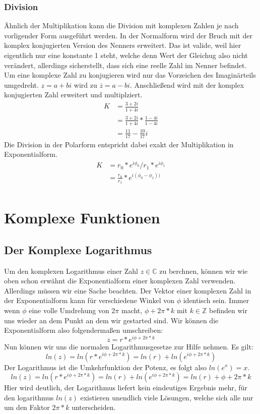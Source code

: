 \documentclass[a4paper, 12pt]{article}
\begin{document}
\subsubsection{Division}
Ähnlich der Multiplikation kann die Division mit komplexen Zahlen je nach vorligender Form ausgeführt werden.
In der Normalform wird der Bruch mit der komplex konjugierten Version des Nenners erweitert. Das ist valide, weil hier eigentlich nur eine konstante 1 steht, welche denn Wert der Gleichug also nicht verändert, allerdings sicherstellt, dass sich eine reelle Zahl im Nenner befindet. 
Um eine komplexe Zahl zu konjugieren wird nur das Vorzeichen des Imaginärteils umgedreht. 
$z = a +bi$ wird zu  $\overline{z} = a - bi$.
Anschließend wird mit der komplex konjugierten Zahl erweitert und multiplziert. 
\begin{equation} \label{div_ex1}
  \begin{split}
    K & = \frac{3 + 2i}{1 + 4i} \\
    & = \frac{3 + 2i}{1 + 4i} * \frac{1 -4i}{1 - 4i} \\
    & = \frac{11}{17} - \frac{10}{17}i
 \end{split}
\end{equation}
Die Division in der Polarform entspricht dabei exakt der Multiplikation in Exponentialform.
\begin{equation} \label{div_ex2}
  \begin{split}
    K & = r_0 * e^{i \phi_0}/r_1 * e^{i \phi_1} \\
    & = \frac{r_0}{r_1} * e^{i (\phi_0 - \phi_1))} \\
 \end{split}
\end{equation}

\section{Komplexe Funktionen}
\subsection{Der Komplexe Logarithmus}
Um den komplexen Logarithmus einer Zahl $z \in \mathbb{C}$ zu berchnen, können wir wie oben schon erwähnt die Exponentialform einer komplexen Zahl verwenden. Allerdings müssen wir eine Sache beachten.
Der Vektor einer komplexen Zahl in der Exponentialform kann für verschiedene Winkel von $\phi$ identisch sein. Immer wenn $\phi$ eine volle Umdrehung von $2 \pi$ macht, $\phi  +2\pi * k$ mit $k \in \mathbb{Z}$ befinden wir uns wieder an dem Punkt an dem wir gestarted sind.
Wir können die Exponentialform also folgendermaßen umschreiben:
\[z = r * e^{i\phi +  2\pi * k}\]
Nun können wir uns die normalen Logarithmusgesetze zur Hilfe nehmen. Es gilt:
\[ln(z) = ln(r * e^{i\phi +  2\pi * k}) = ln(r) + ln(e^{i\phi +  2\pi * k})\]
Der Logarithmus ist die Umkehrfunktion der Potenz, es folgt also $ln(e^x) = x$.
\[ln(z) = ln(r * e^{i\phi +  2\pi * k}) = ln(r) + ln(e^{i\phi +  2\pi * k}) = ln(r) + \phi + 2\pi * k\]
Hier wird deutlich, der Logarithmus liefert kein eindeutiges Ergebnis mehr, für den logarithmus $ln(z)$ existieren unendlich viele Lösungen, welche sich alle nur um den Faktor $2 \pi * k$ unterscheiden. \cite{komp_log}
\end{document}
